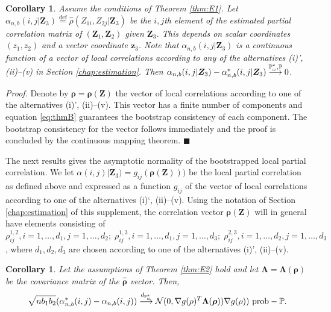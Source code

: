 \documentclass[
  12pt,
  letterpaper]{article}
\newtheorem{cor}[thm]{Corollary}
\numberwithin{equation}{section}
\newcommand{\Z}{\bm{Z}}
\newcommand{\z}{\bm{z}}
\newcommand{\frho}{\bm{\rho}}
\newcommand{\fLambda}{\bm{\Lambda}}
\begin{document}
\begin{cor}
Assume the conditions of Theorem \ref{thm:E1}. Let $\alpha_{n,b}(i,j|\Z_3) \stackrel{\textrm{def}}{=} \widehat \rho(Z_{1i}, Z_{2j}|\Z_3)$ be the $i,j$th element of the estimated partial correlation matrix of $(\Z_1, \Z_2)$ given $\Z_3$. This depends on scalar coordinates $(z_1, z_2)$ and a vector coordinate $\z_3$. Note that $\alpha_{n,b}(i,j|\Z_3)$ is a continuous function of a vector of local correlations according to any of the alternatives (i)', (ii)--(v) in Section \ref{chap:estimation}. Then $\alpha_{n,b}(i,j|\Z_3) - \alpha^*_{n,b}(i,j|\Z_3) \buildrel {\mathbb{P}_{\omega}^{*},\mathbb{P}} \over {\longrightarrow} 0$. 
\label{cor:E3}
\end{cor}

\emph{Proof.} Denote by \(\frho = \frho(\Z)\) the vector of local correlations according to one of the alternatives (i)', (ii)--(v). This vector has a finite number of components and equation \eqref{eq:thmB} guarantees the bootstrap consistency of each component. The bootstrap consistency for the vector follows immediately and the proof is concluded by the continuous mapping theorem. \(\blacksquare\)

The next results gives the asymptotic normality of the bootstrapped local partial correlation. We let \(\alpha(i,j)|\Z_3) = g_{ij}(\frho(\Z)))\) be the local partial correlation as defined above and expressed as a function \(g_{ij}\) of the vector of local correlations according to one of the alternatives (i)`, (ii)--(v). Using the notation of Section \ref{chap:estimation} of this supplement, the correlation vector \(\frho(\Z)\) will in general have elements consisting of \(\rho_{ij}^{1,2}, i =1,\ldots,d_1, j=1,\ldots,d_2;\;\rho_{ij}^{1,3}, i=1,\ldots,d_1, j=1,\ldots,d_3;\;\rho_{ij}^{2,3}, i=1,\ldots,d_2, j=1,\ldots,d_3\), where \(d_1,d_2,d_3\) are chosen according to one of the alternatives (i)', (ii)--(v).

\begin{cor}
Let the assumptions of Theorem \ref{thm:E2} hold and let $\fLambda = \fLambda(\frho)$ be the covariance matrix of the $\widehat{\frho}$ vector. Then,
$$
\sqrt{nb_1b_2}(\alpha_{n,b}^*(i,j)-\alpha_{n,b}(i,j)) \buildrel {d_{\mathbb{P}_{\omega}^{*}}} \over {\longrightarrow} {\cal N}(0,\nabla g(\rho)^T \fLambda(\frho)) \nabla g(\rho)) \,\, \mbox{prob}-\mathbb{P}. 
$$ 
\label{cor:E4}
\end{cor}
\end{document}
